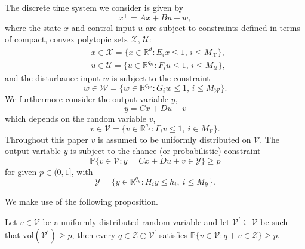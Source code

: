 \documentclass{ifacconf}
\providecommand{\vol}{\text{vol}}
\providecommand{\W}{\mathcal W}
\providecommand{\V}{\mathcal V}
\providecommand{\X}{\mathcal X}
\providecommand{\Y}{\mathcal Y}
\providecommand{\Z}{\mathcal Z}
\providecommand{\U}{\mathcal U}
\providecommand{\PP}{\mathbb P}
\providecommand{\RR}{\mathbb R}
\begin{document}
The discrete time system we consider is given by
%
\begin{equation}\label{eq:system}
	x^+ = Ax + Bu + w ,
\end{equation}
%
where the state $x$ and control input $u$ are subject to constraints defined in terms of compact, convex polytopic sets $\X$, $\U$:
\begin{equation}\label{eq:state_input:constraints}
\begin{aligned}
&x \in\X = \bigl\{x\in\RR^d : E_ix\leq 1, \, i\leq M_\X\bigr\}, \\
&u\in\U = \bigl\{u\in\RR^{q_\U} : F_i u\leq 1, \, i\leq M_\U\bigr\},
\end{aligned}
\end{equation} 
and the disturbance input $w$ is subject to the constraint
\begin{equation}\label{eq:disturbance}
w\in\W = \bigl\{w\in\RR^{q_\W}:G_i w\leq 1,\, i\leq M_\W \bigr\}.
\end{equation}
%
We furthermore consider the output variable $y$,
%
\[%
	y = Cx + Du + v
\]%
%
which depends on the random variable $v$,
\[
v\in\V = \bigl\{v\in\RR^{q_\Y}:\Gamma_i v\leq 1, \ i\in M_\V\bigr\}. 
\]
Throughout this paper $v$ is assumed to be uniformly distributed on $\V$.
%
The output variable $y$ is subject to the chance (or probabilistic) constraint
%
\begin{equation}\label{eq:probabilistic:constraint}
	\PP\bigl\{ v \in \mathcal{V} : y = Cx + Du + v \in \mathcal{Y} \bigr\}\geq p
\end{equation}
%
for given $p\in(0,1]$, with
\[
\Y=\bigl\{y\in\RR^{q_\Y} : H_i y\leq h_i, \ i\leq M_\Y\bigr\}.
\]

We make  use of the following proposition.
%

\vspace{0.5\baselineskip}
\begin{prop}\label{prop1}
Let $v\in\V$ be a uniformly distributed random variable and let $\V^\prime\subseteq\V$ be such that $\vol(\V^\prime)\geq p$, then every $q\in\Z\ominus\V^\prime$ satisfies $\PP\{v\in\V : q+v\in\Z\}\geq p$.
\end{prop}
%
\end{document}
